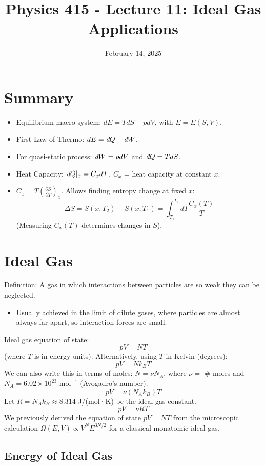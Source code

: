 \documentclass[11pt]{article}
\title{Physics 415 - Lecture 11: Ideal Gas Applications}
\date{February 14, 2025}
\author{} %
\newcommand{\pderiv}[2]{\frac{\partial #1}{\partial #2}}
\newcommand{\ethbar}{\text{\it{đ}}} %
\newcommand{\kb}{k_B} %
\newcommand{\Na}{N_A} %
\newcommand{\gasR}{R} %
\begin{document}
\maketitle
\thispagestyle{empty}

\section*{Summary}

\begin{itemize}
    \item Equilibrium macro system: $dE = T dS - p dV$, with $E=E(S,V)$.
    \item First Law of Thermo: $dE = \ethbar Q - \ethbar W$.
    \item For quasi-static process: $\ethbar W = p dV$ and $\ethbar Q = T dS$.
    \item Heat Capacity: $\ethbar Q|_x = C_x dT$. $C_x$ = heat capacity at constant $x$.
    \item $C_x = T \left( \pderiv{S}{T} \right)_x$. Allows finding entropy change at fixed $x$:
    \[ \Delta S = S(x, T_2) - S(x, T_1) = \int_{T_1}^{T_2} dT \frac{C_x(T)}{T} \]
    (Measuring $C_x(T)$ determines changes in $S$).
\end{itemize}

\section*{Ideal Gas}

Definition: A gas in which interactions between particles are so weak they can be neglected.
\begin{itemize}
    \item Usually achieved in the limit of dilute gases, where particles are almost always far apart, so interaction forces are small.
\end{itemize}
Ideal gas equation of state:
\[ pV = N T \]
(where $T$ is in energy units).
Alternatively, using $T$ in Kelvin (degrees):
\[ pV = N \kb T \]
We can also write this in terms of moles: $N = \nu \Na$, where $\nu=$ \# moles and $\Na = 6.02 \times 10^{23}$ mol$^{-1}$ (Avogadro's number).
\[ pV = \nu (\Na \kb) T \]
Let $\gasR = \Na \kb \approx 8.314$ J/(mol·K) be the ideal gas constant.
\[ pV = \nu \gasR T \]
We previously derived the equation of state $pV=NT$ from the microscopic calculation $\Omega(E,V) \propto V^N E^{3N/2}$ for a classical monatomic ideal gas.

\subsection*{Energy of Ideal Gas}
\end{document}
